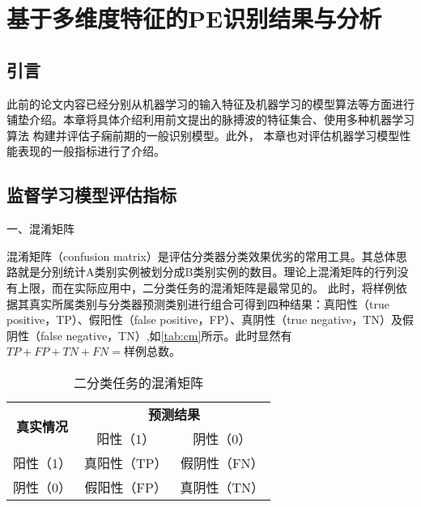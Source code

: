 \chapter{基于多维度特征的PE识别结果与分析}
\section{引言}
此前的论文内容已经分别从机器学习的输入特征及机器学习的模型算法等方面进行铺垫介绍。本章将具体介绍利用前文提出的脉搏波的特征集合、使用多种机器学习算法
构建并评估子痫前期的一般识别模型。此外， 本章也对评估机器学习模型性能表现的一般指标进行了介绍。
\section{监督学习模型评估指标}
一、混淆矩阵

混淆矩阵（confusion matrix）是评估分类器分类效果优劣的常用工具\cite{Zhou2016,Aurélien2018}。其总体思路就是分别统计A类别实例被划分成B类别实例的数目。理论上混淆矩阵的行列没有上限，而在实际应用中，二分类任务的混淆矩阵是最常见的。
此时，将样例依据其真实所属类别与分类器预测类别进行组合可得到四种结果：真阳性（true positive，TP）、假阳性（false positive，FP）、真阴性（true negative，TN）及假阴性（false negative，TN）,如\autoref{tab:cm}所示。此时显然有
$TP+FP+TN+FN=\text{样例总数}$。
\begin{table}[htbp]
      \centering
      \caption{\label{tab:cm}二分类任务的混淆矩阵}
      \begin{tabular}{ccc}
      \toprule
      \multicolumn{1}{c}{\multirow{2}[4]{*}{\textbf{真实情况}}} & \multicolumn{2}{c}{\textbf{预测结果}} \\
            \cmidrule{2-3}          & 阳性（1） & 阴性（0） \\
      \midrule
      阳性（1） & 真阳性（TP） & 假阴性（FN） \\
      阴性（0） & 假阳性（FP） & 真阴性（TN） \\
      \bottomrule
      \end{tabular}%
\end{table}%

